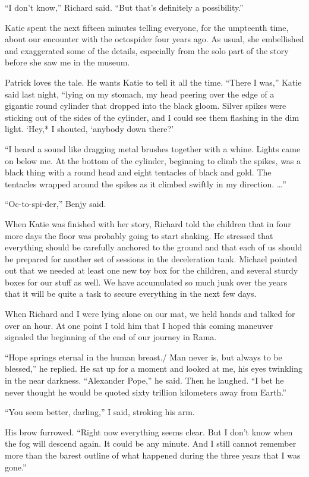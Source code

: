 \documentclass[]{article}
\begin{document}
{“I don’t know,” Richard said.  “But that’s definitely a possibility.”

Katie spent the next fifteen minutes telling everyone, for the umpteenth time, about our encounter with the octospider four years ago.  As usual, she embellished and exaggerated some of the details, especially from the solo part of the story before she saw me in the museum.

Patrick loves the tale.  He wants Katie to tell it all the time.  “There I was,” Katie said last night, “lying on my stomach, my head peering over the edge of a gigantic round cylinder that dropped into the black gloom.  Silver spikes were sticking out of the sides of the cylinder, and I could see them flashing in the dim light.  ‘Hey,* I shouted, ‘anybody down there?’

“I heard a sound like dragging metal brushes together with a whine.  Lights came on below me.  At the bottom of the cylinder, beginning to climb the spikes, was a black thing with a round head and eight tentacles of black and gold.  The tentacles wrapped around the spikes as it climbed swiftly in my direction.  …”

“Oc-to-spi-der,” Benjy said.

When Katie was finished with her story, Richard told the children that in four more days the floor was probably going to start shaking.  He stressed that everything should be carefully anchored to the ground and that each of us should be prepared for another set of sessions in the deceleration tank.  Michael pointed out that we needed at least one new toy box for the children, and several sturdy boxes for our stuff as well.  We have accumulated so much junk over the years that it will be quite a task to secure everything in the next few days.

When Richard and I were lying alone on our mat, we held hands and talked for over an hour.  At one point I told him that I hoped this coming maneuver signaled the beginning of the end of our journey in Rama.

“Hope springs eternal in the human breast./ Man never is, but always to be blessed,” he replied.  He sat up for a moment and looked at me, his eyes twinkling in the near darkness.  “Alexander Pope,” he said.  Then he laughed.  “I bet he never thought he would be quoted sixty trillion kilometers away from Earth.”

“You seem better, darling,” I said, stroking his arm.

His brow furrowed.  “Right now everything seems clear.  But I don’t know when the fog will descend again.  It could be any minute.  And I still cannot remember more than the barest outline of what happened during the three years that I was gone.”

}
\end{document}
